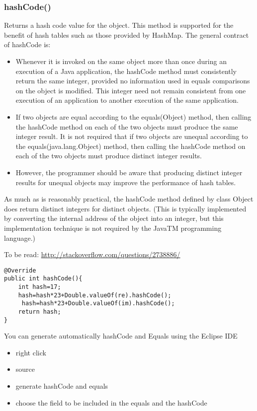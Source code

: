 \documentclass{article}
\begin{document}
\subsubsection{hashCode()}
Returns a hash code value for the object. This method is supported for the benefit of hash tables such as those provided by HashMap.
The general contract of hashCode is:
\begin{itemize}
\item Whenever it is invoked on the same object more than once during an execution of a Java application, the hashCode method must consistently return the same integer, provided no information used in equals comparisons on the object is modified. This integer need not remain consistent from one execution of an application to another execution of the same application.
\item If two objects are equal according to the equals(Object) method, then calling the hashCode method on each of the two objects must produce the same integer result.
It is not required that if two objects are unequal according to the equals(java.lang.Object) method, then calling the hashCode method on each of the two objects must produce distinct integer results. 
\item However, the programmer should be aware that producing distinct integer results for unequal objects may improve the performance of hash tables.
\end{itemize}
As much as is reasonably practical, the hashCode method defined by class Object does return distinct integers for distinct objects. (This is typically implemented by converting the internal address of the object into an integer, but this implementation technique is not required by the JavaTM programming language.)

To be read: \url{http://stackoverflow.com/questions/2738886/}

\begin{lstlisting}
@Override
public int hashCode(){
    int hash=17;
    hash=hash*23+Double.valueOf(re).hashCode();
     hash=hash*23+Double.valueOf(im).hashCode();
    return hash;
}
\end{lstlisting}

You can generate automatically hashCode and Equals using the Eclipse IDE
\begin{itemize}
\item right click
\item source
\item generate hashCode and equals
\item choose the field to be included in the equals and the hashCode
\end{itemize}
\end{document}
